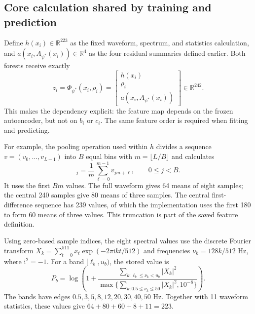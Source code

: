 \subsection{Core calculation shared by training and prediction}

Define $h(x_i)\in\mathbb{R}^{223}$ as the fixed waveform, spectrum, and
statistics calculation, and $a(x_i,A_{\psi^*}(x_i))\in\mathbb{R}^{4}$ as the
four residual summaries defined earlier. Both forests receive exactly
\begin{equation}
 z_i=\Phi_{\psi^*}(x_i,\rho_i)=
 \begin{bmatrix}
 h(x_i)\\ \rho_i\\ a(x_i,A_{\psi^*}(x_i))
 \end{bmatrix}\in\mathbb{R}^{242}.
 \label{eq:method-shared-feature-map}
\end{equation}
This makes the dependency explicit: the feature map depends on the frozen
autoencoder, but not on $b_i$ or $c_i$. The same feature order is required
when fitting and predicting.

For example, the pooling operation used within $h$ divides a sequence
$v=(v_0,\ldots,v_{L-1})$ into $B$ equal bins with
$m=\lfloor L/B\rfloor$ and calculates
\begin{equation}
 [\operatorname{pool}_B(v)]_j=
 \frac{1}{m}\sum_{\ell=0}^{m-1}v_{jm+\ell},\qquad 0\leq j<B.
 \label{eq:method-feature-pooling}
\end{equation}
It uses the first $Bm$ values. The full waveform gives 64 means of eight
samples; the central 240 samples give 80 means of three samples. The central
first-difference sequence has 239 values, of which the implementation uses
the first 180 to form 60 means of three values. This truncation is part of
the saved feature definition.

Using zero-based sample indices, the eight spectral values use the discrete Fourier transform
$X_k=\sum_{t=0}^{511}x_t\exp(-2\pi\mathrm{i}kt/512)$ and frequencies
$\nu_k=128k/512$ Hz, where $\mathrm{i}^2=-1$. For a band $[\ell_b,u_b)$, the stored value is
\begin{equation}
 P_b=\log\left(1+
 \frac{\sum_{k:\ell_b\leq\nu_k<u_b}|X_k|^2}
 {\max\{\sum_{k:0.5\leq\nu_k\leq50}|X_k|^2,10^{-8}\}}
 \right).
 \label{eq:method-feature-spectrum}
\end{equation}
The bands have edges $0.5,3,5,8,12,20,30,40,50$ Hz. Together with
11 waveform statistics, these values give $64+80+60+8+11=223$.

